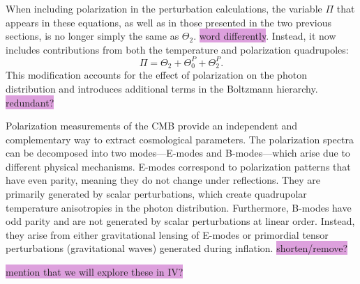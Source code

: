\documentclass{aa}
\numberwithin{equation}{section}
\numberwithin{table}{section}
\numberwithin{figure}{section}
\begin{document}
When including polarization in the perturbation calculations, the variable $\Pi$ that appears in these equations, as well as in those presented in the two previous sections, is no longer simply the same as $\Theta_2$. \colorbox{Plum}{word differently}. Instead, it now includes contributions from both the temperature and polarization quadrupoles: 
\begin{equation} 
  \Pi = \Theta_2 + \Theta^P_{0} + \Theta^P_{2}. 
\end{equation}
This modification accounts for the effect of polarization on the photon distribution and introduces additional terms in the Boltzmann hierarchy. \colorbox{Plum}{redundant?}

Polarization measurements of the CMB provide an independent and complementary way to extract cosmological parameters. The polarization spectra can be decomposed into two modes—E-modes and B-modes—which arise due to different physical mechanisms.
E-modes correspond to polarization patterns that have even parity, meaning they do not change under reflections. They are primarily generated by scalar perturbations, which create quadrupolar temperature anisotropies in the photon distribution. 
Furthermore, B-modes have odd parity and are not generated by scalar perturbations at linear order. Instead, they arise from either gravitational lensing of E-modes or primordial tensor perturbations (gravitational waves) generated during inflation. \colorbox{Plum}{shorten/remove?}

\colorbox{Plum}{mention that we will explore these in IV?}
\end{document}
